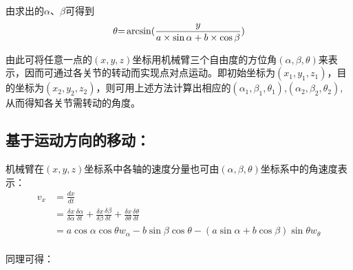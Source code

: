 由求出的$\alpha$、$\beta$可得到
\begin{equation}
\theta {\rm{ = }}\arcsin (\frac{y}{{a \times \sin \alpha  + b \times \cos \beta }})
\end{equation}

由此可将任意一点的$(x,y,z)$坐标用机械臂三个自由度的方位角$(\alpha,\beta,\theta)$来表示，因而可通过各关节的转动而实现点对点运动。即初始坐标为$(x_1,y_1,z_1)$，目的坐标为$(x_2,y_2,z_2)$，则可用上述方法计算出相应的$(\alpha_1,\beta_1,\theta_1)$,$(\alpha_2,\beta_2,\theta_2)$,从而得知各关节需转动的角度。

\subsection{基于运动方向的移动：}

机械臂在$(x,y,z)$坐标系中各轴的速度分量也可由$(\alpha,\beta,\theta)$坐标系中的角速度表示：
	\begin{displaymath}
		\begin{aligned}
			{v_x}& = \frac{{dx}}{{dt}}\\ &= \frac{{\delta x}}{{\delta \alpha }}\frac{{\delta \alpha }}{{\delta t}} + \frac{{\delta x}}{{\delta \beta }}\frac{{\delta \beta }}{{\delta t}} + \frac{{\delta x}}{{\delta \theta }}\frac{{\delta \theta }}{{\delta t}} \\&= a\cos \alpha \cos \theta {w_\alpha } - b\sin \beta \cos \theta  - (a\sin \alpha  + b\cos \beta )\sin \theta {w_\theta }\\		
		\end{aligned}
	\end{displaymath}
	
	同理可得：
	
